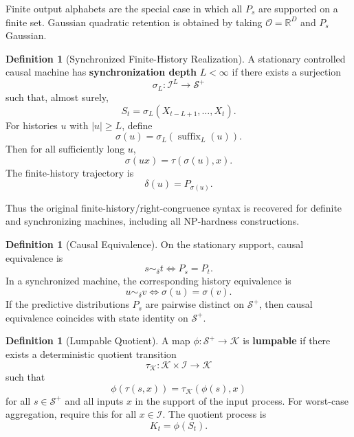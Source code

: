 \documentclass[12pt]{article}
\theoremstyle{definition}
\newtheorem{definition}[theorem]{Definition}
\newcommand{\Splus}{\mathcal S^{+}}
\begin{document}
Finite output alphabets are the special case in which all $P_s$ are supported
on a finite set.  Gaussian quadratic retention is obtained by taking
$\mathcal O=\mathbb R^D$ and $P_s$ Gaussian.

\begin{definition}[Synchronized Finite-History Realization]
\label{def:synchronized-realization}
A stationary controlled causal machine has \textbf{synchronization depth}
$L<\infty$ if there exists a surjection
\[
\sigma_L:\mathcal I^L\to\Splus
\]
such that, almost surely,
\[
S_t=\sigma_L(X_{t-L+1},\dots,X_t).
\]
For histories $u$ with $|u|\ge L$, define
\[
\sigma(u)=\sigma_L(\operatorname{suffix}_L(u)).
\]
Then for all sufficiently long $u$,
\[
\sigma(ux)=\tau(\sigma(u),x).
\]
The finite-history trajectory is
\[
\delta(u)=P_{\sigma(u)}.
\]
\end{definition}

Thus the original finite-history/right-congruence syntax is recovered for
definite and synchronizing machines, including all NP-hardness constructions.

\begin{definition}[Causal Equivalence]
\label{def:causal-equivalence}
On the stationary support, causal equivalence is
\[
s\sim_\delta t
\iff
P_s=P_t.
\]
In a synchronized machine, the corresponding history equivalence is
\[
u\sim_\delta v
\iff
\sigma(u)=\sigma(v).
\]
If the predictive distributions $P_s$ are pairwise distinct on $\Splus$, then
causal equivalence coincides with state identity on $\Splus$.
\end{definition}

\begin{definition}[Lumpable Quotient]
\label{def:lumpable-quotient}
A map $\phi:\Splus\to\mathcal K$ is \textbf{lumpable} if there exists a
deterministic quotient transition
\[
\tau_{\mathcal K}:\mathcal K\times\mathcal I\to\mathcal K
\]
such that
\[
\phi(\tau(s,x))
=
\tau_{\mathcal K}(\phi(s),x)
\]
for all $s\in\Splus$ and all inputs $x$ in the support of the input process.
For worst-case aggregation, require this for all $x\in\mathcal I$.
The quotient process is
\[
K_t=\phi(S_t).
\]
\end{definition}
\end{document}
